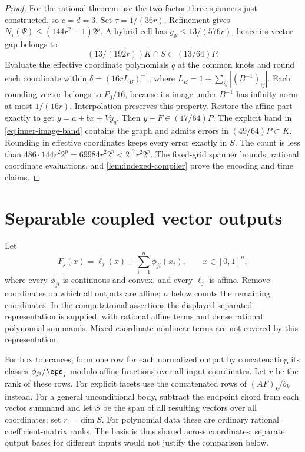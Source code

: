\begin{proof}
For the rational theorem use the two factor-three spanners just
constructed, so $c=d=3$. Set $\tau=1/(36r)$. Refinement gives
$N_\tau(\Psi)\le(144r^2-1)2^p$. A hybrid cell has
$g_\Psi\le13/(576r)$, hence its vector gap belongs to
\[
 (13/(192r))K\cap S\subset(13/64)P.
\]
Evaluate the effective coordinate polynomials $q$ at the common knots
and round each coordinate within
$\delta=(16rL_B)^{-1}$, where
$L_B=1+\sum_{ij}|(B^{-1})_{ij}|$.
Each rounding vector belongs to $P_0/16$, because its image under
$B^{-1}$ has infinity norm at most $1/(16r)$. Interpolation preserves
this property. Restore the affine part exactly to get
$y=a+bx+Vy_q$. Then $y-F\in(17/64)P$.
The explicit band in \eqref{eq:inner-image-band} contains the graph
and admits errors in $(49/64)P\subset K$.
Rounding in effective coordinates keeps every error exactly in $S$.
The count is less than
$486\cdot144r^2 2^p=69984r^2 2^p<2^{17}r^2 2^p$.
The fixed-grid spanner bounds, rational coordinate evaluations, and
\cref{lem:indexed-compiler} prove the encoding and time claims.
\end{proof}

\section{Separable coupled vector outputs}\label{sec:separable-vector}

Let
\begin{equation}\label{eq:separable-vector-model}
 F_j(x)=\ell_j(x)+\sum_{i=1}^n\phi_{ji}(x_i),
 \qquad x\in[0,1]^n,
\end{equation}
where every $\phi_{ji}$ is continuous and convex, and every $\ell_j$
is affine. Remove coordinates on which all outputs are affine; $n$
below counts the remaining coordinates. In the computational assertions
the displayed separated representation is supplied, with rational affine
terms and dense rational polynomial summands. Mixed-coordinate nonlinear
terms are not covered by this representation.

For box tolerances, form one row for each normalized output by concatenating
its classes $\phi_{ji}/\eps_j$ modulo affine functions over all input
coordinates. Let $r$ be the rank of these rows. For explicit facets use
the concatenated rows of $(AF)_k/b_k$ instead. For a general unconditional
body, subtract the endpoint chord from each vector summand and let $S$
be the span of all resulting vectors over all coordinates; set $r=\dim S$.
For polynomial data these are ordinary rational coefficient-matrix ranks.
The basis is thus shared across coordinates; separate output bases for
different inputs would not justify the comparison below.


